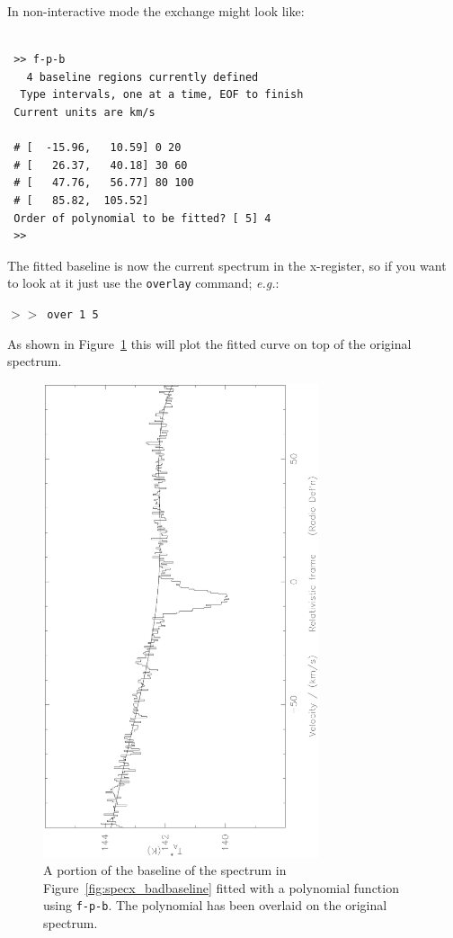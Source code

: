 \documentclass[11pt,twoside]{article}
\newcommand{\eg}{{\it e.g.}}
\newcommand{\SP}{{$>\!>$}}
\begin{document}
In non-interactive mode the exchange might look like:
\begin{verbatim}

 >> f-p-b
   4 baseline regions currently defined
  Type intervals, one at a time, EOF to finish
 Current units are km/s  
 
 # [  -15.96,   10.59] 0 20
 # [   26.37,   40.18] 30 60
 # [   47.76,   56.77] 80 100
 # [   85.82,  105.52]  
 Order of polynomial to be fitted? [ 5] 4
 >> 
\end{verbatim}

The fitted baseline is now the current spectrum in the x-register, so if
you want to
look at it just use the {\tt overlay} command; \eg :

\SP\ \verb|over 1 5|

As shown in Figure~\ref{fig:specx_fpb} this will plot the fitted curve
on top of the original spectrum. 

\begin{figure}[htb]
\centering
\includegraphics[angle=-90,width=3.2in]{sc8_fpb.ps}
\vspace*{-0.5cm}
\begin{center}
\begin{minipage}[t]{5in}
\caption[A polynomial baseline fit]
{\small{A portion of the baseline of the spectrum in
Figure~\ref{fig:specx_badbaseline} fitted with a polynomial function
using {\tt f-p-b}. The polynomial has been overlaid on the original
spectrum.  }}
\label{fig:specx_fpb}
\end{minipage}
\end{center}
\end{figure}
\end{document}
